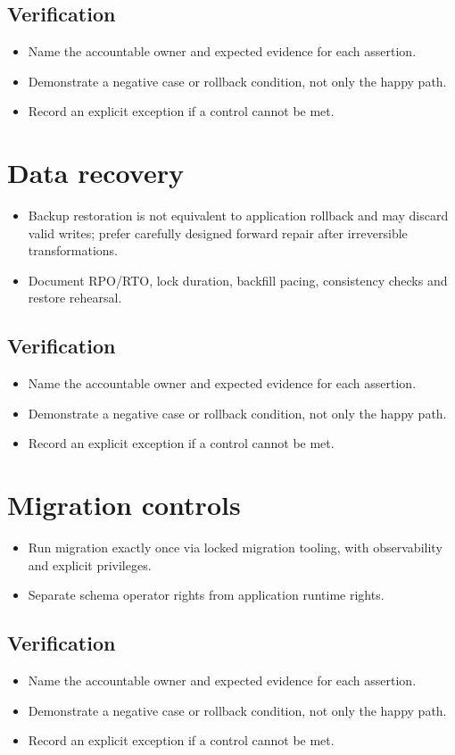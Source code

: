 \documentclass[10pt,letterpaper]{article}
\begin{document}
\subsection{Verification}
\begin{itemize}
\item Name the accountable owner and expected evidence for each assertion.
\item Demonstrate a negative case or rollback condition, not only the happy path.
\item Record an explicit exception if a control cannot be met.
\end{itemize}


\section{Data recovery}
\begin{itemize}
\item Backup restoration is not equivalent to application rollback and may discard valid writes; prefer carefully designed forward repair after irreversible transformations.
\item Document RPO/RTO, lock duration, backfill pacing, consistency checks and restore rehearsal.
\end{itemize}
\subsection{Verification}
\begin{itemize}
\item Name the accountable owner and expected evidence for each assertion.
\item Demonstrate a negative case or rollback condition, not only the happy path.
\item Record an explicit exception if a control cannot be met.
\end{itemize}


\section{Migration controls}
\begin{itemize}
\item Run migration exactly once via locked migration tooling, with observability and explicit privileges.
\item Separate schema operator rights from application runtime rights.
\end{itemize}
\subsection{Verification}
\begin{itemize}
\item Name the accountable owner and expected evidence for each assertion.
\item Demonstrate a negative case or rollback condition, not only the happy path.
\item Record an explicit exception if a control cannot be met.
\end{itemize}
\end{document}

